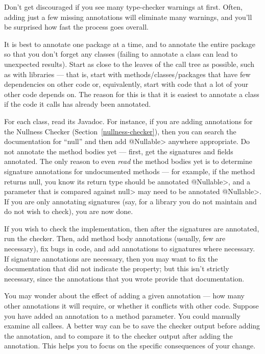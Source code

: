 Don't get discouraged if you see many type-checker warnings at first.
Often, adding just a few missing annotations will eliminate many warnings,
and you'll be surprised how fast the process goes overall.

It is best to annotate one package at a time,
and to annotate the entire package so that you don't forget any classes
(failing to annotate a class can lead to unexpected results).
Start as close to the leaves of the call tree as possible, such as with
libraries --- that is,
start with methods/classes/packages that have few dependencies on other
code or, equivalently, start with code that a lot of your other code
depends on.  The reason for this is that it is
easiest to annotate a class if the code it calls has already been
annotated.

For each class, read its Javadoc.  For instance, if you are adding
annotations for the Nullness Checker (Section~\ref{nullness-checker}), then
you can search the documentation for ``null'' and then add \<@Nullable>
anywhere appropriate.  Do not annotate the method bodies yet ---
first, get the signatures and fields annotated.  The only reason to even
\emph{read} the method bodies yet is to determine signature annotations for
undocumented methods ---
for example, if the method returns null, you know its return type should be
annotated \<@Nullable>, and a parameter that is compared against \<null>
may need to be annotated \<@Nullable>.  If you are only annotating
signatures (say, for a library you do not maintain and do not wish to
check), you are now done.

If you wish to check the implementation, then after the signatures are
annotated, run the checker.  Then, add method body annotations (usually,
few are necessary), fix bugs in code, and add annotations to signatures
where necessary.  If signature annotations are necessary, then you may want
to fix the documentation that did not indicate the property; but this isn't
strictly necessary, since the annotations that you wrote provide that
documentation.

You may wonder about the effect of adding a given annotation --- how many
other annotations it will require, or whether it conflicts with other code.
Suppose you have added an annotation to a method parameter.  You could
manually examine all callees.  A better way can be to save the checker
output before adding the annotation, and to compare it to the checker
output after adding the annotation.  This helps you to focus on the
specific consequences of your change.

